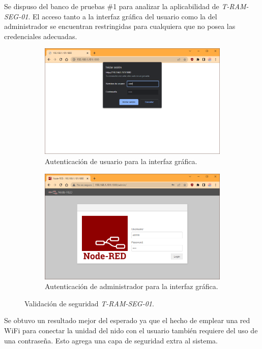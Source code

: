 Se dispuso del banco de pruebas \#1 para analizar la aplicabilidad de \textit{T-RAM-SEG-01}. El acceso tanto a la interfaz gráfica del usuario como la del administrador se encuentran restringidas para cualquiera que no posea las credenciales adecuadas.
\begin{figure}[H]
\centering
    	\begin{subfigure}{0.49\textwidth}
        	\centering
        	\includegraphics[width=\linewidth]{ImagenesValidacion del prototipo/t-ram-seg-01-1}		
			\caption{Autenticación de usuario para la interfaz gráfica.}
        \end{subfigure}\hfill
        \begin{subfigure}{0.49\textwidth}
        	\centering
        	\includegraphics[width=\linewidth]{ImagenesValidacion del prototipo/t-ram-seg-01-2}
        	\caption{Autenticación de administrador para la interfaz gráfica.}
        \end{subfigure}
	\caption{Validación de seguridad \textit{T-RAM-SEG-01}.}
\end{figure}

Se obtuvo un resultado mejor del esperado ya que el hecho de emplear una red WiFi para conectar la unidad del nido con el usuario también requiere del uso de una contraseña. Esto agrega una capa de seguridad extra al sistema.
